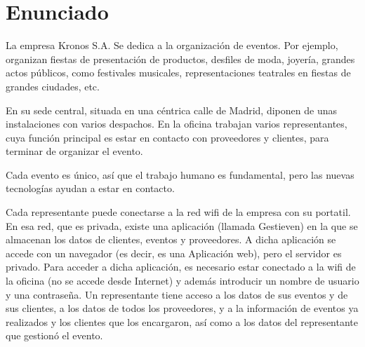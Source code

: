 
\usepackage{eurosym}


\newcommand{\nombreprogramaeventos}{Gestieven}
\newcommand{\nombreempresa}{Kronos}
\renewcommand{\hmwkTitle}{Análisis de riesgos \nombreempresa}


\usepackage{blindtext}






\primerapagina

\setlength{\parindent}{2em}
\setlength{\parskip}{1em}


\section{Enunciado}

La empresa {\nombreempresa} S.A. Se dedica a la organización de eventos. Por ejemplo, organizan fiestas de presentación de productos, desfiles de moda, joyería, grandes actos públicos, como festivales musicales, representaciones teatrales en fiestas de grandes ciudades, etc.

En su sede central, situada en una céntrica calle de Madrid, diponen de unas instalaciones con varios despachos. En la oficina trabajan varios representantes, cuya función principal es estar en contacto con proveedores y clientes, para terminar de organizar el evento.

Cada evento es único, así que el trabajo humano es fundamental, pero las nuevas tecnologías ayudan a estar en contacto.

Cada representante puede conectarse a la red wifi de la empresa con su portatil. En esa red, que es privada, existe una aplicación (llamada {\nombreprogramaeventos}) en la que se almacenan los datos de clientes, eventos y proveedores. A dicha aplicación se accede con un navegador (es decir, es una Aplicación web), pero el servidor es privado.
Para acceder a dicha aplicación, es necesario estar conectado a la wifi de la oficina (no se accede desde Internet) y además introducir un nombre de usuario y una contraseña. Un representante tiene acceso a los datos de sus eventos y de sus clientes, a los datos de todos los proveedores, y a la información de eventos ya realizados y los clientes que los encargaron, así como a los datos del representante que gestionó el evento.

